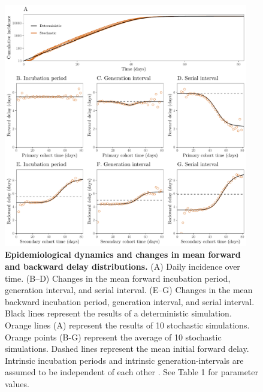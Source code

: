 \documentclass[12pt]{article}
\providecommand{\DIFaddtex}[1]{{\protect\color{blue}\uwave{#1}}} %
\providecommand{\DIFaddFL}[1]{\DIFadd{#1}} %
\providecommand{\DIFaddbeginFL}{} %
\providecommand{\DIFaddendFL}{} %
\providecommand{\DIFadd}[1]{\texorpdfstring{\DIFaddtex{#1}}{#1}} %
\newcommand{\DIFaddincludegraphics}[2][]{{\color{blue}\fbox{\DIFOincludegraphics[#1]{#2}}}} %
\DeclareRobustCommand{\DIFaddbeginFL}{\DIFOaddbeginFL \let\includegraphics\DIFaddincludegraphics} %
\DeclareRobustCommand{\DIFaddendFL}{\DIFOaddendFL \let\includegraphics\DIFOincludegraphics} %
\begin{document}
\begin{figure}[!ht]
\begin{center}
\includegraphics[width=0.95\textwidth]{forward.pdf}
\caption{
\textbf{Epidemiological dynamics and changes in mean forward and backward delay distributions.}
(A) Daily incidence over time.
(B--D) Changes in the mean forward incubation period, generation interval, and serial interval.
(E--G) Changes in the mean backward incubation period, generation interval, and serial interval.
Black lines represent the results of a deterministic simulation.
Orange lines (A) represent the results of 10 stochastic simulations.
Orange points (B-G) represent the average of 10 stochastic simulations.
Dashed lines represent the mean initial forward delay.
Intrinsic incubation periods and intrinsic generation-intervals are assumed to be independent of each other \DIFaddbeginFL \DIFaddFL{for simplicity}\DIFaddendFL .
See Table 1 for parameter values.
}
\label{fig:epi}
\end{center}
\end{figure}
\end{document}
